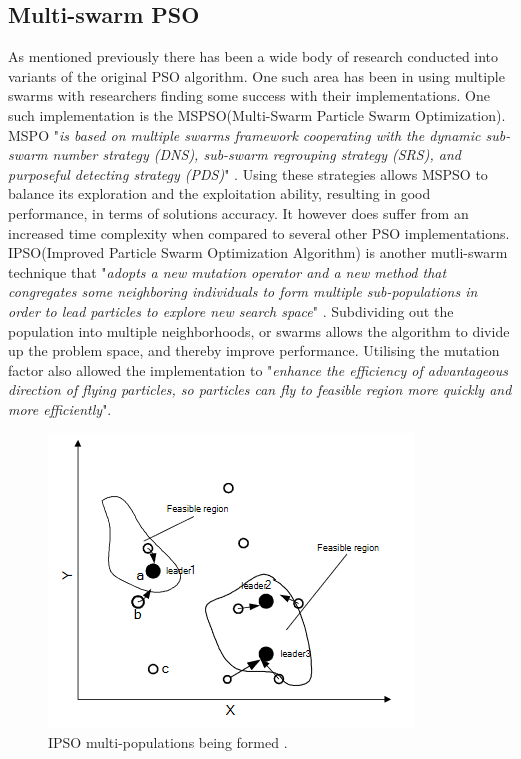 \documentclass[oneside,12pt]{book}
\begin{document}
\subsection{Multi-swarm PSO}
As mentioned previously there has been a wide body of research conducted into variants of the original PSO algorithm. One such area has been in using multiple swarms with researchers finding some success with their implementations. One such implementation is the MSPSO(Multi-Swarm Particle Swarm Optimization). MSPO "\textit{is based on multiple swarms framework cooperating with the dynamic sub-swarm number strategy (DNS), sub-swarm regrouping strategy (SRS), and purposeful detecting strategy (PDS)}" \cite{XIA2018126}. Using these strategies allows MSPSO to balance its exploration and the exploitation ability, resulting in good performance, in terms of solutions accuracy. It however does suffer from an increased time complexity when compared to several other PSO implementations. 
IPSO(Improved Particle Swarm Optimization Algorithm) is another mutli-swarm technique that "\textit{adopts a new mutation operator and a new method that congregates some neighboring individuals to form multiple sub-populations in order to lead particles to explore new search space}" \cite{zheng2007improved}. Subdividing out the population into multiple neighborhoods, or swarms allows the algorithm to divide up the problem space, and thereby improve performance. Utilising the mutation factor also allowed the implementation to "\textit{enhance the efficiency of advantageous direction of flying particles, so particles can fly to feasible region more quickly and more efficiently}".
\begin{figure}[H]
    \centering
    \includegraphics[scale=1.0]{Images/IpsoFormingSwarms.png}
    \caption{IPSO multi-populations being formed .\protect\cite{zheng2007improved} }
    \label{fig:IPSO multi-populations being formed.}
\end{figure}
\end{document}
